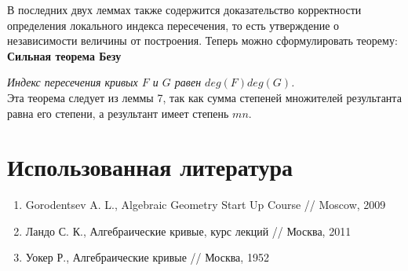 \documentclass[a4paper, 12pt]{article}
\begin{document}
В последних двух леммах также содержится доказательство корректности определения локального индекса пересечения, то есть утверждение о независимости величины от построения. Теперь можно сформулировать теорему:\\

\textbf{Сильная теорема Безу}

\textit{Индекс пересечения кривых $F$ и $G$ равен $deg(F)deg(G)$.}\\

Эта теорема следует из леммы 7, так как сумма степеней множителей результанта равна его степени, а результант имеет степень $mn$.

\begin{comment}
  1. Разложение результанта на билинейные множители. См. семинарский листок из соответствующей алгебры.
  2. Определение локальной кратности пересечения. ()
  3. Совпадение кратности пересечения вообще.
  4. Теорема о совпадении с кратностями множителей результанта.
  5. Оттуда немедленно сильная форма теоремы.
  6. И некоторым довольно длинным образом, полностью описанным у Уокера, соотношения Плюккера.
  _Только эти способом относительно легко перейти к соотношениям Плюккера, вероятно._

  Или

  1. Ввести инвариант непрерывных деформаций кривых - число пересечений с учётом кратностей. Та же ловкость рук.
  2. Кратность определить как число точек пересечения в случае, когда обе прямые вырождены. (соответственно нужно подробно описать класс деформаций.)
  3. Теорема Безу получается автоматически после того, как для каждой конкретной точки посчитается эта кратность. Странно и непонятно.

  Или

  1. Как у Ландо. Но чтобы удержать уровень строгости, нужно ввести много нового аппарата.

  Или

  1. Спрямить одну из кривых.
  2. Определить "число пересечений с учётом кратностей" так, чтобы оно было инвариантом диффеоморфизма. Проблема в особых точках.
  3. Рассмотреть случай на прямой. При этом вторая кривая получает степень mn через преобразование координат.

  Или

  1. Раздутие результанта в диагонали.

  Или

  1. Раздутие нашей плоскости в точках пересечения кривых. Кратность определяется по числу точек, в которые перешла данная. Это согласуется с произведением числа касательных, но намного строже.
  2. Записать раздутие уравнениями.
  3. Посчитать число всех точек на воткнутых прямых. Инвариантным способом на уравнениях.
\end{comment}

\section{Использованная литература}
\begin{enumerate}
  \item Gorodentsev A. L., Algebraic Geometry Start Up Course // Moscow, 2009
  \item Ландо С. К., Алгебраические кривые, курс лекций // Москва, 2011
  \item Уокер Р., Алгебраические кривые // Москва, 1952
\end{enumerate}
\end{document}
